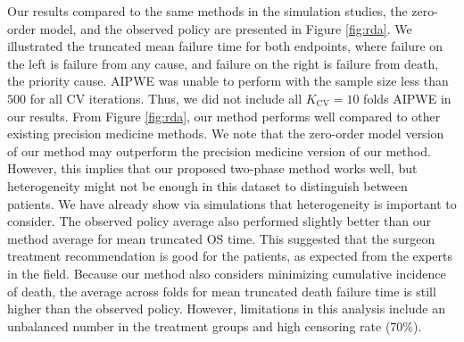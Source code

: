 Our results compared to the same methods in the simulation studies, the zero-order model, and the observed policy are presented in Figure \ref{fig:rda}. We illustrated the truncated mean failure time for both endpoints, where failure on the left is failure from any cause, and failure on the right is failure from death, the priority cause. AIPWE was unable to perform with the sample size less than $500$ for all CV iterations. Thus, we did not include all $K_{\text{CV}} = 10$ folds AIPWE in our results. From Figure \ref{fig:rda}, our method performs well compared to other existing precision medicine methods. We note that the zero-order model version of our method may outperform the precision medicine version of our method. However, this implies that our proposed two-phase method works well, but heterogeneity might not be enough in this dataset to distinguish between patients.  We have already show via simulations that heterogeneity is important to consider. The observed policy average also performed slightly better than our method average for mean truncated OS time. This suggested that the surgeon treatment recommendation is good for the patients, as expected from the experts in the field. Because our method also considers minimizing cumulative incidence of death, the average across folds for mean truncated death failure time is still higher than the observed policy. However, limitations in this analysis include an unbalanced number in the treatment groups and high censoring rate (70\%). 
